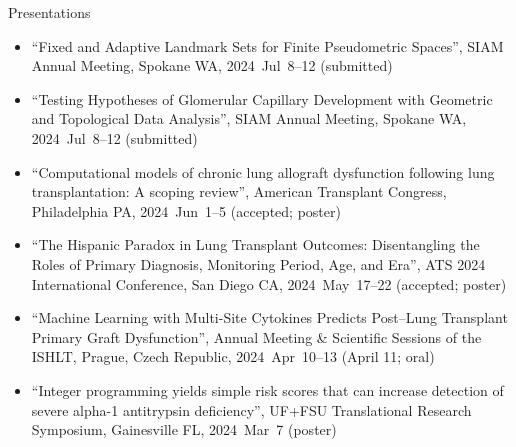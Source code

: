 \documentclass[10pt,a4paper]{article}
\begin{document}
\vspace{.25cm}
{\sc Presentations}
\begin{itemize}[label=$\circ$,nolistsep]
\item
``Fixed and Adaptive Landmark Sets for Finite Pseudometric Spaces'', SIAM Annual Meeting, Spokane WA, 2024~Jul~8--12 (submitted)
\item
``Testing Hypotheses of Glomerular Capillary Development with Geometric and Topological Data Analysis'', SIAM Annual Meeting, Spokane WA, 2024~Jul~8--12 (submitted)
\item
``Computational models of chronic lung allograft dysfunction following lung transplantation: A scoping review'', American Transplant Congress, Philadelphia PA, 2024~Jun~1--5 (accepted; poster)
\item
``The Hispanic Paradox in Lung Transplant Outcomes: Disentangling the Roles of Primary Diagnosis, Monitoring Period, Age, and Era'', ATS 2024 International Conference, San Diego CA, 2024~May~17--22 (accepted; poster)
\item
``Machine Learning with Multi-Site Cytokines Predicts Post--Lung Transplant Primary Graft Dysfunction'', Annual Meeting \& Scientific Sessions of the ISHLT, Prague, Czech Republic, 2024~Apr~10--13 (April 11; oral)
\item
``Integer programming yields simple risk scores that can increase detection of severe alpha-1 antitrypsin deficiency'', UF+FSU Translational Research Symposium, Gainesville FL, 2024~Mar~7 (poster)

\end{itemize}
\end{document}
